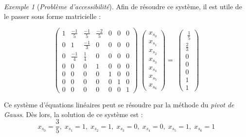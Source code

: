 \documentclass[12pt,a4paper]{report}
\theoremstyle{definition}%
\theoremstyle{remark}
\newtheorem{example}{Exemple}[chapter]
\begin{document}
\begin{example}[\textit{Problème d'accessibilité}]
Afin de résoudre ce système, il est utile de le passer sous forme matricielle :

\[
\begin{pmatrix}
1 & \frac{-1}{5} & \frac{-1}{5} & \frac{-2}{5} & 0 & 0 & 0 \\[0.3em]
0 & 1 & \frac{-1}{3} & 0 & 0 & 0 & 0 \\[0.3em]
0 & \frac{-1}{4} & \frac{1}{4} & 0 & 0 & 0 & 0 \\[0.3em]
0 & 0 & 0 & 1 & 0 & 0 & 0 \\[0.3em]
0 & 0 & 0 & 0 & 1 & 0 & 0 \\[0.3em]
0 & 0 & 0 & 0 & 0 & 1 & 0 \\[0.3em]
0 & 0 & 0 & 0 & 0 & 0 & 1
\end{pmatrix}
\;
\begin{pmatrix}
x_{s_0} \\[0.3em] x _{s_1} \\[0.3em] x_{s_2} \\[0.3em] x_{s_3} \\[0.3em] x_{s_4} \\[0.3em] x_{s_5} \\[0.3em] x_{s_6}
\end{pmatrix}
= \;
\begin{pmatrix}
\; \frac{1}{5} \\[0.3em] \frac{2}{3} \\[0.3em] 0 \\[0.3em] 0 \\[0.3em] 0 \\[0.3em] 1 \\[0.3em] 1
\end{pmatrix}
\]

Ce système d'équations linéaires peut se résoudre par la méthode du \textit{pivot de Gauss}. %
Dès lors, la solution de ce système est :
\[
x_{s_0} = \frac{3}{5}, \; x_{s_1} = 1, \; x_{s_2} = 1, \; x_{s_3} = 0, \; x_{s_4} = 0, \; x_{s_5} = 1, \; x_{s_6} = 1
\]
\end{example}
\end{document}
